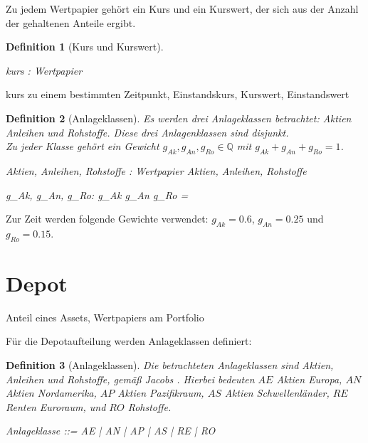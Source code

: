 \documentclass[12pt]{scrartcl}
\newtheorem{zdef}{Definition}[section]
\begin{document}
Zu jedem Wertpapier gehört ein Kurs und ein Kurswert, der sich aus der
Anzahl der gehaltenen Anteile ergibt.

\begin{zdef}[Kurs und Kurswert]
  \label{zdef:kurs-kurswert}
  \begin{axdef}
    kurs : Wertpapier \fun \rat\\
  \end{axdef}
\end{zdef}
kurs zu einem bestimmten Zeitpunkt, Einstandskurs, Kurswert,
Einstandswert

\begin{zdef}[Anlageklassen]
  \label{zdef:anlageklassen}
  Es werden drei \emph{Anlageklassen} betrachtet: \emph{Aktien}
  \emph{Anleihen} und \emph{Rohstoffe}. Diese drei Anlagenklassen
  sind disjunkt.\\
  Zu jeder Klasse gehört ein \emph{Gewicht}
  $g_{Ak}, g_{An}, g_{Ro} \in \mathbb{Q}$ mit
  $g_{Ak} + g_{An} + g_{Ro} = 1 $.
  \begin{axdef}
    Aktien, Anleihen, Rohstoffe : \power Wertpapier
    \where
    \disjoint \langle Aktien, Anleihen,  Rohstoffe \rangle
  \end{axdef}
  \begin{axdef}
    g\_Ak, g\_An, g\_Ro: \rat
    \where
    g\_Ak \aplus g\_An \aplus g\_Ro = \aone
  \end{axdef}
\end{zdef}

Zur Zeit werden folgende Gewichte verwendet: $g_{Ak}=0.6$, $g_{An} =
0.25$ und $g_{Ro} = 0.15$.





\section{Depot}
\label{sec:depot}
Anteil eines Assets, Wertpapiers am Portfolio


Für die Depotaufteilung werden Anlageklassen definiert:

\begin{zdef}[Anlageklassen]
  \label{zdef:anlageklassen}
  Die betrachteten Anlageklassen sind Aktien, Anleihen und Rohstoffe,
  gemäß Jacobs \cite{Jacobs2016}. Hierbei bedeuten $AE$ Aktien Europa,
  $AN$ Aktien Nordamerika, $AP$ Aktien Pazifikraum, $AS$ Aktien
  Schwellenländer, $RE$ Renten Euroraum, und $RO$ Rohstoffe. 
  \begin{zed}
    Anlageklasse ::= AE | AN | AP | AS | RE | RO 
  \end{zed}
\end{zdef}
\end{document}
